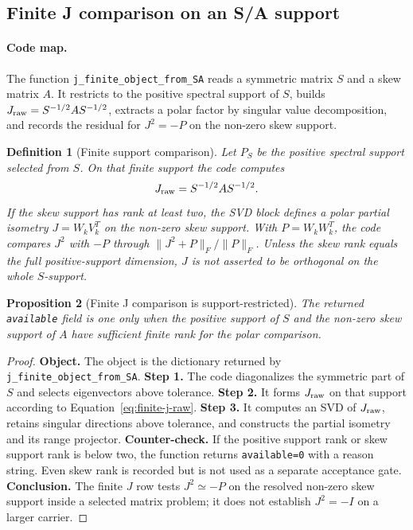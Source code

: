 \documentclass[11pt]{article}
\newtheorem{definition}{Definition}[section]
\newtheorem{proposition}[definition]{Proposition}
\theoremstyle{remark}
\newcommand{\code}[1]{\texttt{#1}}
\numberwithin{equation}{section}
\begin{document}
\subsection{Finite J comparison on an S/A support}
\paragraph{Code map.} The function \code{j\_\allowbreak{}finite\_\allowbreak{}object\_\allowbreak{}from\_\allowbreak{}SA} reads a symmetric matrix \(S\) and a skew matrix \(A\). It restricts to the positive spectral support of \(S\), builds \(J_{\rm raw}=S^{-1/2}AS^{-1/2}\), extracts a polar factor by singular value decomposition, and records the residual for \(J^2=-P\) on the non-zero skew support.

\begin{definition}[Finite support comparison]
Let \(P_S\) be the positive spectral support selected from \(S\). On that finite support the code computes
\begin{equation}
  J_{\rm raw}=S^{-1/2}AS^{-1/2}.
  \label{eq:finite-j-raw}
\end{equation}
If the skew support has rank at least two, the SVD block defines a polar partial isometry \(J=W_kV_k^T\) on the non-zero skew support. With \(P=W_kW_k^T\), the code compares \(J^2\) with \(-P\) through \(\|J^2+P\|_F/\|P\|_F\). Unless the skew rank equals the full positive-support dimension, \(J\) is not asserted to be orthogonal on the whole \(S\)-support.
\end{definition}

\begin{proposition}[Finite J comparison is support-restricted]
The returned \code{available} field is one only when the positive support of \(S\) and the non-zero skew support of \(A\) have sufficient finite rank for the polar comparison.
\end{proposition}
\begin{proof}
\textbf{Object.} The object is the dictionary returned by \code{j\_\allowbreak{}finite\_\allowbreak{}object\_\allowbreak{}from\_\allowbreak{}SA}. \textbf{Step 1.} The code diagonalizes the symmetric part of \(S\) and selects eigenvectors above tolerance. \textbf{Step 2.} It forms \(J_{\rm raw}\) on that support according to Equation~\eqref{eq:finite-j-raw}. \textbf{Step 3.} It computes an SVD of \(J_{\rm raw}\), retains singular directions above tolerance, and constructs the partial isometry and its range projector. \textbf{Counter-check.} If the positive support rank or skew support rank is below two, the function returns \code{available=0} with a reason string. Even skew rank is recorded but is not used as a separate acceptance gate. \textbf{Conclusion.} The finite \(J\) row tests \(J^2\simeq-P\) on the resolved non-zero skew support inside a selected matrix problem; it does not establish \(J^2=-I\) on a larger carrier.
\end{proof}
\end{document}
